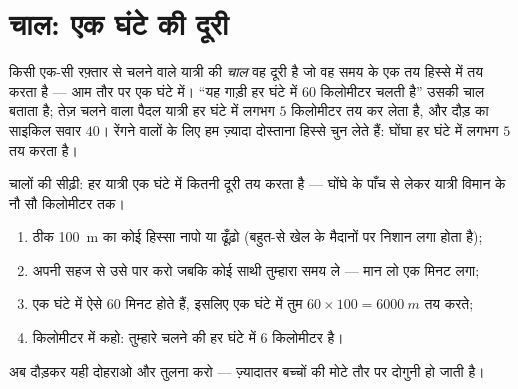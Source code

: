 \section{चाल: एक घंटे की दूरी}

\begin{definition}[चाल]\label{def:g5:speed-distance-time:speed}
किसी एक-सी रफ़्तार से चलने वाले यात्री की \emph{चाल} वह
दूरी है जो वह समय के एक तय हिस्से में तय करता है --- आम तौर पर एक
घंटे में। ``यह गाड़ी हर घंटे में $60$ किलोमीटर चलती है'' उसकी चाल
बताता है; तेज़ चलने वाला पैदल यात्री हर घंटे में लगभग $5$ किलोमीटर तय
कर लेता है, और दौड़ का साइकिल सवार $40$। रेंगने वालों के लिए हम
ज़्यादा दोस्ताना हिस्से चुन लेते हैं: घोंघा हर घंटे में लगभग $5$ 
तय करता है।
\end{definition}

\begin{omfigure}

{\small चालों की सीढ़ी: हर यात्री एक घंटे में कितनी दूरी तय करता है
--- घोंघे के पाँच  से लेकर यात्री विमान के नौ सौ किलोमीटर तक।}
\end{omfigure}

\begin{method}[अपनी चाल मापना]\label{met:g5:speed-distance-time:measure}
\begin{enumerate}
  \item ठीक \qty{100}{m} का कोई हिस्सा नापो या ढूँढ़ो (बहुत-से खेल के
        मैदानों पर निशान लगा होता है);
  \item अपनी सहज  से उसे पार करो जबकि कोई साथी तुम्हारा समय ले
        --- मान लो एक मिनट लगा;
  \item एक घंटे में ऐसे $60$ मिनट होते हैं, इसलिए एक घंटे में तुम
        $60 \times 100 = \qty{6000}{m}$ तय करते;
  \item किलोमीटर में कहो: तुम्हारे चलने की  हर घंटे में $6$
        किलोमीटर है।
\end{enumerate}
अब दौड़कर यही दोहराओ और तुलना करो --- ज़्यादातर बच्चों की  मोटे
तौर पर दोगुनी हो जाती है।
\end{method}

